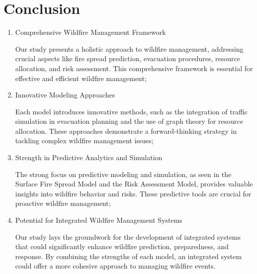 \documentclass[12pt]{article}  %
\begin{document}
 \section{Conclusion}
 \begin{enumerate}[\bfseries 1.]
 	\setlength{\parsep}{0ex} 
 	\setlength{\topsep}{2ex} 
 	\setlength{\itemsep}{1ex} 
 	\item Comprehensive Wildfire Management Framework
 	
 	Our study presents a holistic approach to wildfire management, addressing crucial aspects like fire spread prediction, evacuation procedures, resource allocation, and risk assessment. This comprehensive framework is essential for effective and efficient wildfire management;
 	
 	\item Innovative Modeling Approaches
 	
 	Each model introduces innovative methods, such as the integration of traffic simulation in evacuation planning and the use of graph theory for resource allocation. These approaches demonstrate a forward-thinking strategy in tackling complex wildfire management issues;
 	
 	\item Strength in Predictive Analytics and Simulation
 	
 	The strong focus on predictive modeling and simulation, as seen in the Surface Fire Spread Model and the Risk Assessment Model, provides valuable insights into wildfire behavior and risks. These predictive tools are crucial for proactive wildfire management;
 	
 	\item Potential for Integrated Wildfire Management Systems
 	
 	Our study lays the groundwork for the development of integrated systems that could significantly enhance wildfire prediction, preparedness, and response. By combining the strengths of each model, an integrated system could offer a more cohesive approach to managing wildfire events.
 \end{enumerate}

 
 
 
\end{document}
